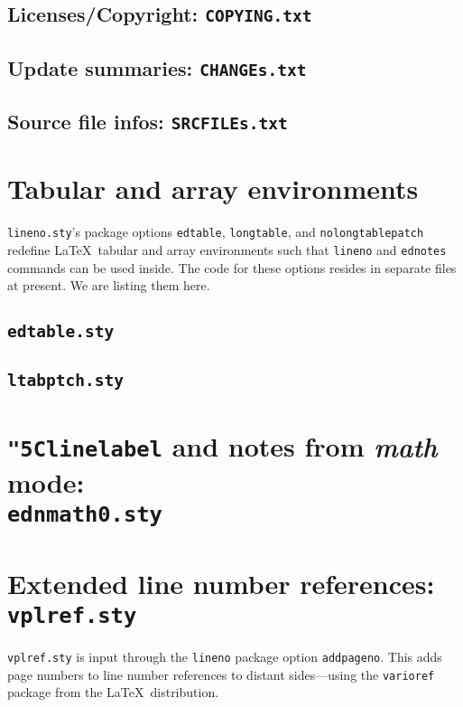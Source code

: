 \documentclass[10pt]{article}
\makeatletter
\newcommand*{\cs}[1]{\texttt{\char"5C#1}}
\newcommand*{\notinaux}[1]{%
  \ifx\protect\@typeset@protect #1%
  \else
    \ifdim\lastskip>\z@\ignorespaces\fi
  \fi}
\makeatother
\begin{document}
\subsection{Licenses/Copyright: \texttt{COPYING.txt}}

\subsection{Update summaries: \texttt{CHANGEs.txt}}

% 
\subsection{Source file infos: \texttt{SRCFILEs.txt}}


\section{Tabular and array environments}
\texttt{lineno.sty}'s package options \texttt{edtable},
\texttt{longtable}, and \texttt{nolongtablepatch}
redefine \LaTeX\ tabular and array environments
such that \texttt{lineno} and \texttt{ednotes} commands
can be used inside. The code for these options resides
in separate files at present. We are listing them here.
\subsection{\texttt{edtable.sty}}

\subsection{\texttt{ltabptch.sty}}


\section{\cs{linelabel} and notes from \textit{math} mode:
         \notinaux{\\} \texttt{ednmath0.sty}}


\section{Extended line number references: \texttt{vplref.sty}}
\texttt{vplref.sty} is input through the \texttt{lineno}
package option \texttt{addpageno}. This adds page numbers
to line number references to distant sides---using the
\texttt{varioref} package from the \LaTeX\ distribution.

\end{document}
